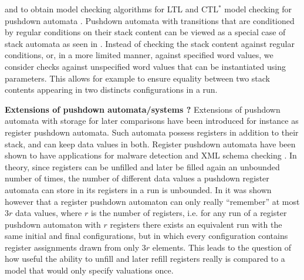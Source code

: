 \documentclass[a4paper,UKenglish,cleveref, autoref, thm-restate]{lipics-v2021}
\begin{document}
and to obtain 
model checking algorithms for LTL and CTL$^*$ model checking
for
pushdown automata \cite{finkel1997direct}.
Pushdown automata 
with transitions that are conditioned by regular conditions on their stack content
can be viewed as
a special case of stack automata as seen in \cite{hopcroft1969formal}.
Instead
of checking the stack content against regular conditions, or, in a more limited manner,
against specified word values,
we consider
checks against unspecified word values that can be instantiated using parameters.
This allows for example to ensure equality between two stack contents appearing in two distincts configurations in a run.

{\bf Extensions of  pushdown automata/systems ?}
Extensions of pushdown automata with storage for later comparisons
have been introduced for instance as register pushdown automata. 
Such automata possess registers in addition to their stack, and can keep data values in both.
Register pushdown automata have been shown to have applications for malware detection and XML schema checking \cite{senda2021forward, senda2021ltl}. 
In theory, since registers can be unfilled and later be filled again an unbounded number of times, the number of different data values a pushdown register automata can store in its registers in a run is unbounded.  
In \cite{murawski2017reachability} it was shown however that a register pushdown automaton can
only really ``remember'' at most  $3r$ data values, where $r$ is the number of registers,
i.e. for any run of a register pushdown automaton with $r$ registers there exists an equivalent run %
 with the same initial and final conﬁgurations, but in which every configuration contains register assignments drawn from only $3r$ elements. This 
 leads to
 the
  question
  of
   how useful the ability to unfill and later refill registers really is compared to a model that would only specify valuations once.



%
\end{document}

